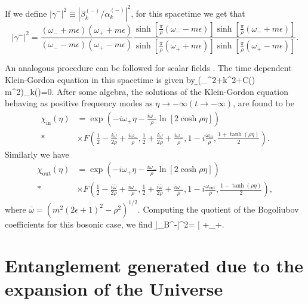 If we define $|\gamma^{-}|^2 \equiv \left|\beta^{(-)}_{k}/\alpha^{(-)}_{k}\right|^2$, for this spacetime we get that 
\begin{equation}
\left|\gamma^{-}\right|^2 =\frac{(\omega_- +m\epsilon)(\omega_+ +
m\epsilon)}{( \omega_-
- m\epsilon)(\omega_+ -m\epsilon)}\frac{\sinh\left[\frac{\pi}{\rho} (\omega_- -
m\epsilon)\right]\sinh\left[\frac{\pi}{\rho} (\omega_- + m\epsilon)\right]}{\sinh\left[\frac{\pi}{\rho}(\omega_+
+m\epsilon)\right]\sinh\left[\frac{\pi}{\rho}(\omega_+ -m\epsilon)\right]}.\label{gamma-F}
\end{equation}

An analogous procedure can be followed for scalar fields \cite{caball}. The time dependent
Klein-Gordon equation in this spacetime is given by \b
\left(\partial_{\eta }^{2}+k^2+C(\eta) m^2\right)\chi_k(\eta)=0.
\e After some algebra, the solutions of the Klein-Gordon equation
behaving as positive frequency modes as $\eta \rightarrow -\infty
(t\rightarrow -\infty )$, are found to be
\begin{align}
\chi_{\text{in}}(\eta)&=\exp\left(-i\omega_+\eta-
 \nonumber \frac{i\omega_-}{\rho}\ln[2\cosh\rho\eta]\right)\\*
&\times F\left(\frac{1}{2}-\frac{i\bar{\omega}}{2\rho}+\frac{i\omega_-}{\rho},
\frac{1}{2}+\frac{i\bar{\omega}}{2\rho}+\frac{i\omega_-}{\rho},
1-i\frac{\omega_{\text{in}}}{\rho},\frac{1+\tanh(\rho\eta)}{2}\right).
\end{align}
Similarly we have
\begin{align}
\chi_{\text{out}}(\eta)&=\exp\left(-i\omega_+\eta-
 \frac{i\omega_-}{\rho}\ln[2\cosh\rho\eta]\right)\nonumber\\*
&\times F\left(\frac{1}{2}-\frac{i\bar{\omega}}{2\rho}+\frac{i\omega_-}{\rho},
\frac{1}{2}+\frac{i\bar{\omega}}{2\rho}+\frac{i\omega_-}{\rho},
1-i\frac{\omega_{\text{out}}}{\rho},\frac{1-\tanh(\rho\eta)}{2}\right),
\end{align}
 where $\bar{\omega}=(m^2(2\epsilon+1)^2-\rho^2)^{1/2}$. Computing the quotient of the Bogoliubov coefficients for this bosonic case,  we find
 \b
|\gamma_B^{-}|^2=\frac{\cosh\frac{\pi}{\rho}\bar{\omega}
+\cosh\frac{2\pi}{\rho}\omega_-}
{\cosh\frac{\pi}{\rho}\bar{\omega}
+\cosh\frac{2\pi}{\rho}\omega_+}.  \label{gammaB}
\e


\section{Entanglement generated due to the expansion of the Universe}\label{sec3}


